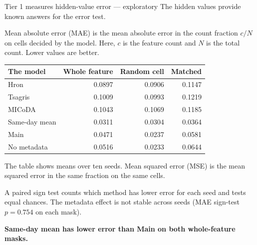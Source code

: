 \begin{frame}{Tier 1 measures hidden-value error --- exploratory}
\fontsize{8.5}{10.3}\selectfont
The hidden values provide known answers for the error test.
\par\medskip
Mean absolute error (MAE) is the mean absolute error in the count fraction $c/N$ on cells decided by the model. Here, $c$ is the feature count and $N$ is the total count. Lower values are better.\begin{center}\begin{tabular}{lrrr}\hline
The model & Whole feature & Random cell & Matched \\\hline
Hron & 0.0897 & 0.0906 & 0.1147 \\
Tsagris & 0.1009 & 0.0993 & 0.1219 \\
MICoDA & 0.1043 & 0.1069 & 0.1185 \\
Same-day mean & 0.0311 & 0.0304 & 0.0364 \\
Main & 0.0471 & 0.0237 & 0.0581 \\
No metadata & 0.0516 & 0.0233 & 0.0644 \\
\hline\end{tabular}\end{center}The table shows means over ten seeds. Mean squared error (MSE) is the mean squared error in the same fraction on the same cells.\par\medskip A paired sign test counts which method has lower error for each seed and tests equal chances. The metadata effect is not stable across seeds (MAE sign-test $p=0.754$ on each mask).
\par\medskip
\textbf{Same-day mean has lower error than Main on both whole-feature masks.}
\end{frame}
